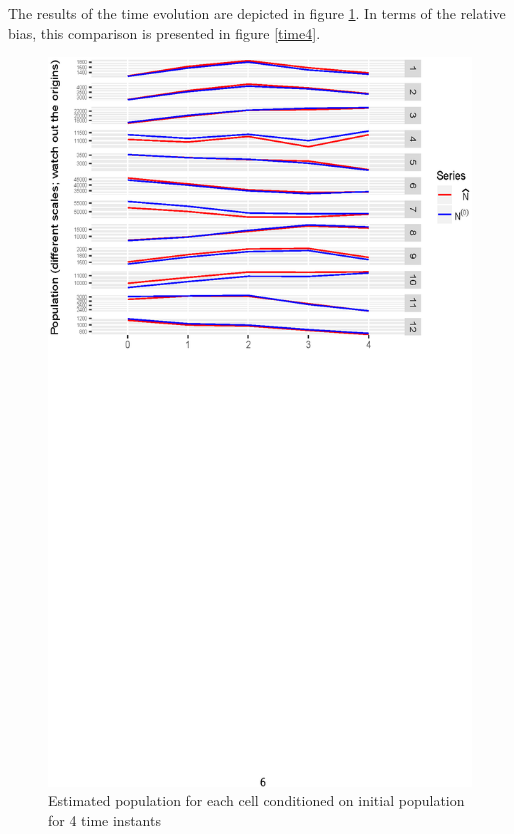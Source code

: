 \documentclass[12pt, a4paper]{article}
\begin{document}
The results of the time evolution are depicted in figure \ref{time3}. In terms of the relative bias, this comparison is presented in figure \ref{time4}.

\begin{figure}
	\centering
	\includegraphics[scale=0.85]{time3.eps}
	\caption{Estimated population for each cell conditioned on initial population for 4 time instants}
	\label{time3} 	
\end{figure}
 
\end{document}

